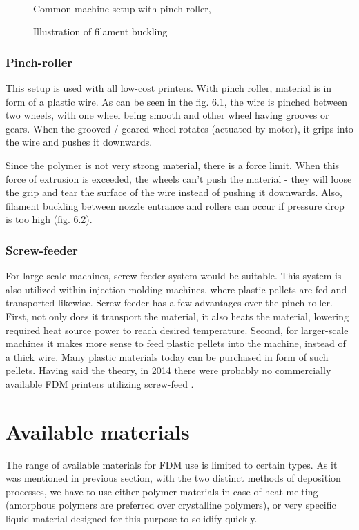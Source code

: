 \documentclass[a4paper, 11pt, reqno]{report}
\begin{document}
\begin{figure}[h]
\begin{minipage}[b]{0.45\textwidth}
  \end{minipage}
  \\[5pt]
  \begin{minipage}[t]{0.45\textwidth}
    \caption{Common machine setup with pinch roller, \cite{MachineDesign}}
  \end{minipage}
  \hfill
  \begin{minipage}[t]{0.45\textwidth}
    \caption{Illustration of filament buckling \cite{FDMReview}}
  \end{minipage}
\end{figure}

\subsubsection{Pinch-roller}
This setup is used with all low-cost printers. With pinch roller, material is in form of a plastic wire. As can be seen in the fig. 6.1, the wire is pinched between two wheels, with one wheel being smooth and other wheel having grooves or gears. When the grooved / geared wheel rotates (actuated by motor), it grips into the wire and pushes it downwards.

	Since the polymer is not very strong material, there is a force limit. When this force of extrusion is exceeded, the wheels can't push the material - they will loose the grip and tear the surface of the wire instead of pushing it downwards. Also, filament buckling between nozzle entrance and rollers can occur if pressure drop is too high (fig. 6.2).
\subsubsection{Screw-feeder}
For large-scale machines, screw-feeder system would be suitable. This system is also utilized within injection molding machines, where plastic pellets are fed and transported likewise. Screw-feeder has a few advantages over the pinch-roller. First, not only does it transport the material, it also heats the material, lowering required heat source power to reach desired temperature. Second, for larger-scale machines it makes more sense to feed plastic pellets into the machine, instead of a thick wire. Many plastic materials today can be purchased in form of such pellets. Having said the theory, in 2014 there were probably no commercially available FDM printers utilizing screw-feed \cite[p. 193]{FDMReview}.

\section{Available materials}
The range of available materials for FDM use is limited to certain types. As it was mentioned in previous section, with the two distinct methods of deposition processes, we have to use either polymer materials in case of heat melting (amorphous polymers are preferred over crystalline polymers), or very specific liquid material designed for this purpose to solidify quickly.
\end{document}
